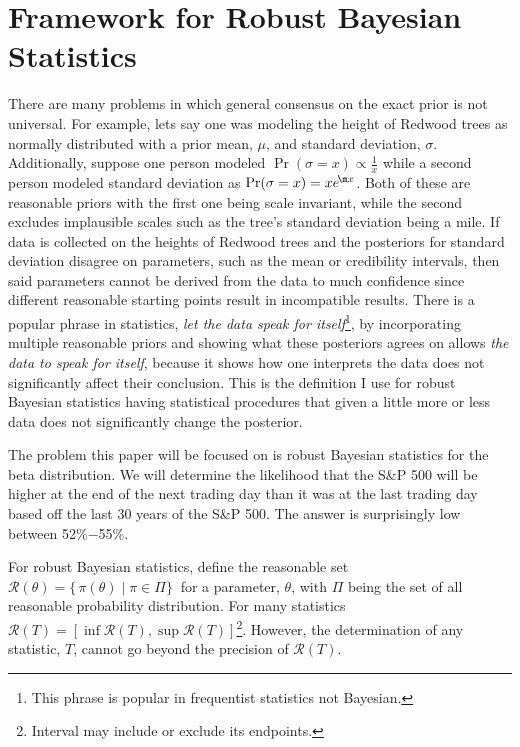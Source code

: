 \documentclass[12pt,letterpaper]{article}
\begin{document}
\section{Framework for Robust Bayesian Statistics}
\indent There are many problems in which general consensus on the exact prior is not universal. For example, lets say 
one was modeling the height of Redwood trees as normally distributed with a prior mean, $\mu$, and standard deviation, $\sigma$.
Additionally, suppose one person modeled $\Pr(\sigma=x) \propto \frac{1}{x}$ while a second person modeled standard deviation as 
$\Pr(\sigma=x)=x e^{\!\m  x}$.
Both of these are reasonable priors with the first one being scale invariant, while the second excludes implausible scales such as 
the tree's standard deviation being a mile. If data is collected on the heights of Redwood trees and the posteriors for standard deviation disagree on parameters, 
such as the mean or credibility intervals, then said parameters cannot be derived from the data to much confidence since different 
reasonable starting points result in incompatible results. There is a popular phrase in statistics, 
\textit{let the data speak for itself}\footnote{This phrase is popular in frequentist statistics not Bayesian.},
by incorporating multiple reasonable priors and showing what these posteriors agrees on allows \textit{the data to speak for itself},
because it shows how one interprets the data does not significantly affect their conclusion. 
This is the definition I use for robust Bayesian statistics having statistical procedures that given a little more or less data 
does not significantly change the posterior.
\par
The problem this paper will be focused on is robust Bayesian statistics for the beta distribution.
We will determine the likelihood that  the S\&P 500 
will be higher at the end of the next trading day than it was at the last trading day %
based off the last 30 years of the S\&P 500. The answer is surprisingly low between 52\%$-$55\%.
\par
For robust Bayesian statistics, define the reasonable set \allowbreak
\mbox{$\mathcal{R}(\theta)=\{\, \pi(\theta) \mid \pi \in \Pi \}\ $} for a parameter, $\theta$, with $\Pi$ being the set 
of all reasonable probability distribution. For many statistics 
\mbox{$\mathcal{R}(T)=[\inf \mathcal{R}(T),\sup \mathcal{R}(T)]$}\footnote{Interval may include or exclude its endpoints.}.  
However, the determination of any statistic, $T$, cannot go beyond the precision of \mbox{$\mathcal{R}(T)$}. 
\end{document}
